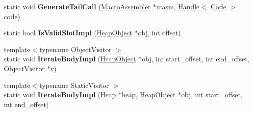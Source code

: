 \begin{DoxyCompactItemize}
\item 
static void {\bfseries Generate\+Tail\+Call} (\hyperlink{classv8_1_1internal_1_1_macro_assembler}{Macro\+Assembler} $\ast$masm, \hyperlink{classv8_1_1internal_1_1_handle}{Handle}$<$ \hyperlink{classv8_1_1internal_1_1_code}{Code} $>$ code)\hypertarget{classv8_1_1internal_1_1_b_a_s_e___e_m_b_e_d_d_e_d_a974f5b5b4b9e571eccbfd10f862c3601}{}\label{classv8_1_1internal_1_1_b_a_s_e___e_m_b_e_d_d_e_d_a974f5b5b4b9e571eccbfd10f862c3601}

\item 
static bool {\bfseries Is\+Valid\+Slot\+Impl} (\hyperlink{classv8_1_1internal_1_1_heap_object}{Heap\+Object} $\ast$obj, int offset)\hypertarget{classv8_1_1internal_1_1_b_a_s_e___e_m_b_e_d_d_e_d_a28edf2b5b65da00b5f1e4de783ab4221}{}\label{classv8_1_1internal_1_1_b_a_s_e___e_m_b_e_d_d_e_d_a28edf2b5b65da00b5f1e4de783ab4221}

\item 
{\footnotesize template$<$typename Object\+Visitor $>$ }\\static void {\bfseries Iterate\+Body\+Impl} (\hyperlink{classv8_1_1internal_1_1_heap_object}{Heap\+Object} $\ast$obj, int start\+\_\+offset, int end\+\_\+offset, Object\+Visitor $\ast$v)\hypertarget{classv8_1_1internal_1_1_b_a_s_e___e_m_b_e_d_d_e_d_aa756db4dac729f7e4f3663a50866a990}{}\label{classv8_1_1internal_1_1_b_a_s_e___e_m_b_e_d_d_e_d_aa756db4dac729f7e4f3663a50866a990}

\item 
{\footnotesize template$<$typename Static\+Visitor $>$ }\\static void {\bfseries Iterate\+Body\+Impl} (\hyperlink{classv8_1_1internal_1_1_heap}{Heap} $\ast$heap, \hyperlink{classv8_1_1internal_1_1_heap_object}{Heap\+Object} $\ast$obj, int start\+\_\+offset, int end\+\_\+offset)\hypertarget{classv8_1_1internal_1_1_b_a_s_e___e_m_b_e_d_d_e_d_a927783e13b985e02d29a7d9629e80739}{}\label{classv8_1_1internal_1_1_b_a_s_e___e_m_b_e_d_d_e_d_a927783e13b985e02d29a7d9629e80739}

\end{DoxyCompactItemize}
